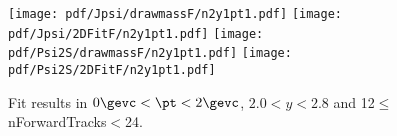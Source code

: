 \begin{figure}[H]
\begin{center}
\texttt{[image: pdf/Jpsi/drawmassF/n2y1pt1.pdf]}
\texttt{[image: pdf/Jpsi/2DFitF/n2y1pt1.pdf]}
\vspace*{-0.5cm}
\texttt{[image: pdf/Psi2S/drawmassF/n2y1pt1.pdf]}
\texttt{[image: pdf/Psi2S/2DFitF/n2y1pt1.pdf]}
\vspace*{-0.5cm}
\end{center}
\caption{Fit results in $0\gevc<\pt<2\gevc$, $2.0<y<2.8$ and 12$\leq$nForwardTracks$<$24.}
\label{Fitn2y1pt1}
\end{figure}
